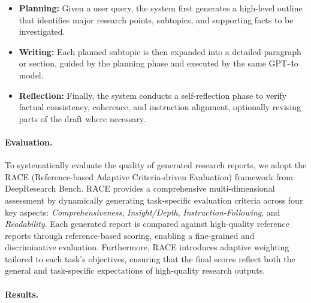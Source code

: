 \documentclass[11pt]{article}
\begin{document}
\begin{itemize}
    \item \textbf{Planning:} Given a user query, the system first generates a high-level outline that identifies major research points, subtopics, and supporting facts to be investigated.
    \item \textbf{Writing:} Each planned subtopic is then expanded into a detailed paragraph or section, guided by the planning phase and executed by the same GPT-4o model.
    \item \textbf{Reflection:} Finally, the system conducts a self-reflection phase to verify factual consistency, coherence, and instruction alignment, optionally revising parts of the draft where necessary.
\end{itemize}

\paragraph{Evaluation.}
To systematically evaluate the quality of generated research reports, we adopt the RACE (Reference-based Adaptive Criteria-driven Evaluation) framework from DeepResearch Bench\cite{du2025deepresearch}. RACE provides a comprehensive multi-dimensional assessment by dynamically generating task-specific evaluation criteria across four key aspects: \textit{Comprehensiveness}, \textit{Insight/Depth}, \textit{Instruction-Following}, and \textit{Readability}. Each generated report is compared against high-quality reference reports through reference-based scoring, enabling a fine-grained and discriminative evaluation. Furthermore, RACE introduces adaptive weighting tailored to each task’s objectives, ensuring that the final scores reflect both the general and task-specific expectations of high-quality research outputs.

\paragraph{Results.}
\end{document}
